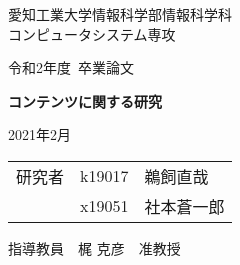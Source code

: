 \thispagestyle{myheadings}

\vspace{-1.0cm}

\begin{center}

{\LARGE 愛知工業大学情報科学部情報科学科\\
コンピュータシステム専攻

\vspace{1.0cm}

令和2年度~卒業論文\\

\vspace{2.0cm}

{\Huge 
\baselineskip=15mm
\textbf{コンテンツに関する研究\\}}

\vspace{7.0cm}

2021年2月\\

\vspace{1.0cm}

\begin{tabular}[h]{lll}
  研究者  & k19017 & 鵜飼直哉\\
         & x19051 & 社本蒼一郎\\
\end{tabular}

\vspace{1.0cm}

指導教員\ \ 梶 克彦\ \ 准教授}

\end{center}